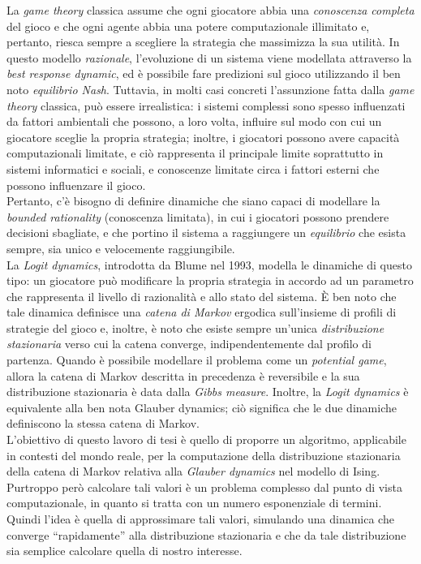 \documentclass[11pt,oneside]{book}
\theoremstyle{plain}
\begin{document}
La \textit{game theory} classica assume che ogni giocatore abbia una \textit{conoscenza completa} del gioco e che ogni agente abbia una potere computazionale illimitato e, pertanto, riesca sempre a scegliere la strategia che massimizza la sua utilità. In questo modello \textit{razionale}, l’evoluzione di un sistema viene modellata attraverso la \textit{best response dynamic}, ed è possibile fare predizioni sul gioco utilizzando il ben noto \textit{equilibrio Nash}. Tuttavia, in molti casi concreti l’assunzione fatta dalla \textit{game theory} classica, può essere irrealistica: i sistemi complessi sono spesso influenzati da fattori ambientali che possono, a loro volta, influire sul modo con cui un giocatore sceglie la propria strategia; inoltre, i giocatori possono avere capacità computazionali limitate, e ciò rappresenta il principale limite soprattutto in sistemi informatici e sociali, e conoscenze limitate circa i fattori esterni che possono influenzare il gioco.\\
Pertanto, c’è bisogno di definire dinamiche che siano capaci di modellare la \textit{bounded rationality} (conoscenza limitata), in cui i giocatori possono prendere decisioni sbagliate, e che portino il sistema a raggiungere un \textit{equilibrio} che esista sempre, sia unico e velocemente raggiungibile.\\
La \textit{Logit dynamics}, introdotta da Blume nel 1993, modella le dinamiche di questo tipo: un giocatore può modificare la propria strategia in accordo ad un parametro che rappresenta il livello di razionalità e allo stato del sistema. È ben noto che tale dinamica definisce una \textit{catena di Markov} ergodica sull’insieme di profili di strategie del gioco e, inoltre, è noto che esiste sempre un’unica \textit{distribuzione stazionaria} verso cui la catena converge, indipendentemente dal profilo di partenza. Quando è possibile modellare il problema come un \textit{potential game}, allora la catena di Markov descritta in precedenza è reversibile e la sua distribuzione stazionaria è data dalla \textit{Gibbs measure}. Inoltre, la \textit{Logit dynamics} è equivalente alla ben nota Glauber dynamics; ciò significa che le due dinamiche definiscono la stessa catena di Markov.\\
L’obiettivo di questo lavoro di tesi è quello di proporre un algoritmo, applicabile in contesti del mondo reale, per la computazione della distribuzione stazionaria della catena di Markov relativa alla \textit{Glauber dynamics} nel modello di Ising.\\
Purtroppo però calcolare tali valori è un problema complesso dal punto di vista computazionale, in quanto si tratta con un numero esponenziale di termini. Quindi l'idea è quella di approssimare tali valori, simulando una dinamica che converge ``rapidamente'' alla distribuzione stazionaria e che da tale distribuzione sia semplice calcolare quella di nostro interesse.\\
\end{document}
